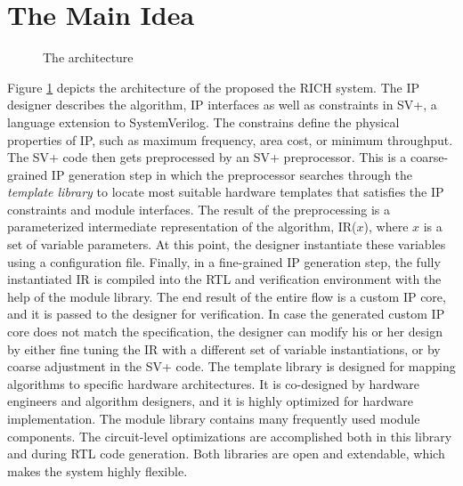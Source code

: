 \section{The Main Idea}

\begin{figure}[t]
\begin{center}
\caption{The architecture}\label{fig-idea}
\end{center}
\end{figure}



Figure \ref{fig-idea} depicts the architecture of the proposed the RICH system. 
The IP designer describes the algorithm, IP interfaces as well as constraints in SV+, 
a language extension to SystemVerilog. 
The constrains define the physical properties of IP, such as maximum frequency, area cost, or minimum throughput.
The SV+ code then gets preprocessed by an SV+ preprocessor.
This is a coarse-grained IP generation step in which the preprocessor searches
through the {\em template library} to locate most suitable hardware templates that satisfies the
IP constraints and module interfaces. The result of the preprocessing is a parameterized 
intermediate representation of the algorithm, IR($x$),  where $x$ is a set of variable parameters. 
At this point, the designer instantiate these variables using a configuration file. 
Finally, in a fine-grained IP generation step, the fully
instantiated IR is compiled into the RTL and verification environment with
the help of the module library. The end result of the entire flow is a custom IP core, 
and it is passed to the designer for verification.
In case the generated custom IP core does not match the specification, 
the designer can modify his or her design by either fine tuning the IR with a different set of variable
instantiations, or by coarse adjustment in the SV+ code.
The template library is designed for mapping algorithms to specific hardware architectures. 
It is co-designed by hardware engineers and algorithm designers, and it is highly optimized for 
hardware implementation. 
The module library contains many frequently used module components. 
The circuit-level optimizations are accomplished both in this library and during RTL code generation. 
Both libraries are open and extendable, which makes the system highly flexible. 


